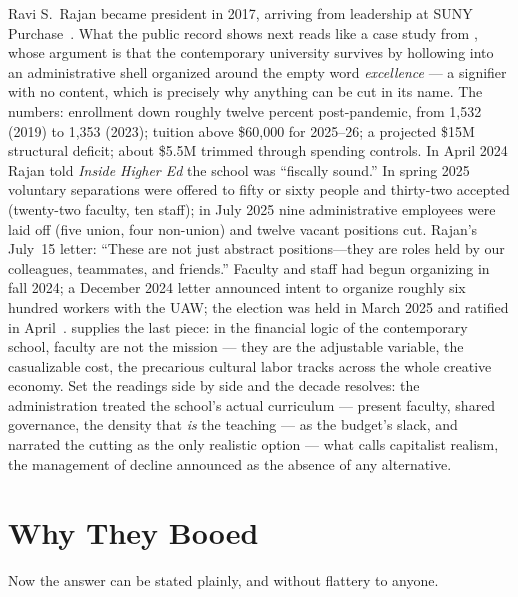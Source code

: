 \documentclass[10pt,letterpaper,twocolumn]{article}
\begin{document}
Ravi S.~Rajan became president in 2017, arriving from leadership at SUNY
Purchase~\citep{calarts_rajan_bio}. What the public record shows next reads
like a case study from \citet{readings1996ruins}, whose argument is that the
contemporary university survives by hollowing into an administrative shell
organized around the empty word \emph{excellence} --- a signifier with no
content, which is precisely why anything can be cut in its name. The numbers:
enrollment down roughly twelve percent post-pandemic, from 1{,}532 (2019) to
1{,}353 (2023); tuition above \$60{,}000 for 2025--26; a projected \$15M
structural deficit; about \$5.5M trimmed through spending controls. In April
2024 Rajan told \emph{Inside Higher Ed} the school was ``fiscally sound.'' In
spring 2025 voluntary separations were offered to fifty or sixty people and
thirty-two accepted (twenty-two faculty, ten staff); in July 2025 nine
administrative employees were laid off (five union, four non-union) and twelve
vacant positions cut. Rajan's July~15 letter: ``These are not just abstract
positions---they are roles held by our colleagues, teammates, and friends.''
Faculty and staff had begun organizing in fall 2024; a December 2024 letter
announced intent to organize roughly six hundred workers with the UAW; the
election was held in March 2025 and ratified in
April~\citep{artnewspaper2024union, hyperallergic2025layoffs,
calarts_sustainable2025}. \citet{bousquet2008university} supplies the last
piece: in the financial logic of the contemporary school, faculty are not the
mission --- they are the adjustable variable, the casualizable cost, the
precarious cultural labor \citet{ross2009nice} tracks across the whole
creative economy. Set the readings side by side and the decade resolves: the
administration treated the school's actual curriculum --- present faculty,
shared governance, the density that \emph{is} the teaching --- as the
budget's slack, and narrated the cutting as the only realistic option ---
what \citet{fisher2009capitalist} calls capitalist realism, the management of
decline announced as the absence of any alternative.

\section{Why They Booed}

Now the answer can be stated plainly, and without flattery to anyone.
\end{document}
